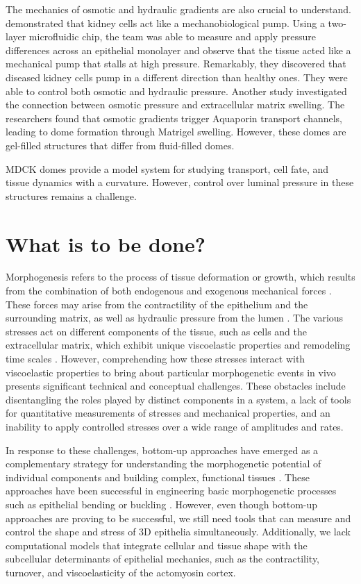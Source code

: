 The mechanics of osmotic and hydraulic gradients are also crucial to understand. \citet{choudhury2022} demonstrated that kidney cells act like a mechanobiological pump. Using a two-layer microfluidic chip, the team was able to measure and apply pressure differences across an epithelial monolayer and observe that the tissue acted like a mechanical pump that stalls at high pressure. Remarkably, they discovered that diseased kidney cells pump in a different direction than healthy ones. They were able to control both osmotic and hydraulic pressure. Another study \citet{ishida-ishihara2020} investigated the connection between osmotic pressure and extracellular matrix swelling. The researchers found that osmotic gradients trigger Aquaporin transport channels, leading to dome formation through Matrigel swelling. However, these domes are gel-filled structures that  differ from fluid-filled domes.

MDCK domes provide a model system for studying transport, cell fate, and tissue dynamics with a curvature. However, control over luminal pressure in these structures remains a challenge.

\hypertarget{what-is-to-be-done}{%
	\section{What is to be done?}\label{what-is-to-be-done}}

Morphogenesis refers to the process of tissue deformation or growth, which results from the combination of both endogenous and exogenous mechanical forces \cite{valet2022, collinet2021}. These forces may arise from the contractility of the epithelium and the surrounding matrix, as well as hydraulic pressure from the lumen \cite{torres-sanchez2021, chan2020}. The various stresses act on different components of the tissue, such as cells and the extracellular matrix, which exhibit unique viscoelastic properties and remodeling time scales \cite{cavanaugh2020, kelkar2020, ambrosi2019}. However, comprehending how these stresses interact with viscoelastic properties to bring about particular morphogenetic events in vivo presents significant technical and conceptual challenges. These obstacles include disentangling the roles played by distinct components in a system, a lack of tools for quantitative measurements of stresses and mechanical properties, and an inability to apply controlled stresses over a wide range of amplitudes and rates.

In response to these challenges, bottom-up approaches have emerged as a complementary strategy for understanding the morphogenetic potential of individual components and building complex, functional tissues \cite{trentesaux2023, ingber2018}. These approaches have been successful in engineering basic morphogenetic processes such as epithelial bending or buckling \cite{matejcic2022}. However, even though bottom-up approaches are proving to be successful, we still need tools that can measure and control the shape and stress of 3D epithelia simultaneously. Additionally, we lack computational models that integrate cellular and tissue shape with the subcellular determinants of epithelial mechanics, such as the contractility, turnover, and viscoelasticity of the actomyosin cortex.

